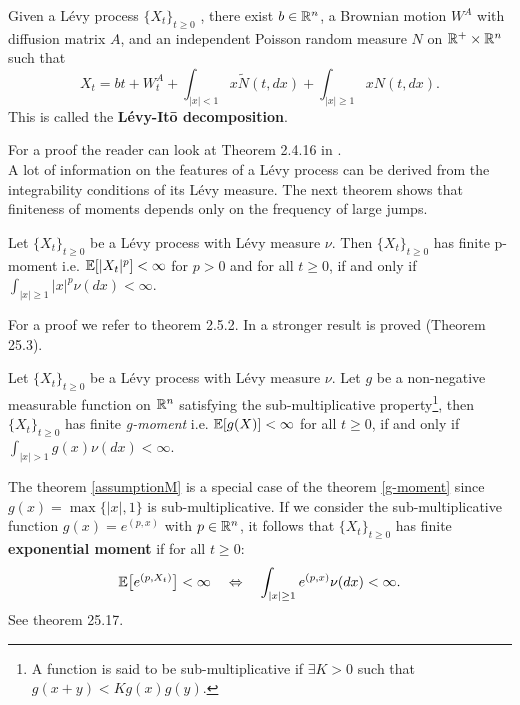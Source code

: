 \begin{Theorem}
 Given a Lévy process $\{X_t\}_{t \ge 0}$ , there exist $b\in \mathbb{R}^n$, a Brownian motion $W^A$ with diffusion matrix $A$, and an 
 independent Poisson random measure $N$ on $\mathbb{R}^+ \times \mathbb{R}^n$ such that
 \begin{equation}\label{Levy_Ito}
  X_t = bt + W^A_t + \int_{|x|<1} x \tilde{N}(t,dx) + \int_{|x|\geq1} x N(t,dx).
 \end{equation}
 This is called the \textbf{Lévy-It\={o} decomposition}.
\end{Theorem}
 For a proof the reader can look at Theorem 2.4.16 in \cite{Applebaum}.\\
A lot of information on the features of a Lévy process can be derived from the integrability conditions of its Lévy measure. 
The next theorem shows that finiteness of moments depends only on the frequency of large jumps.
\begin{Theorem} \label{assumptionM}
 Let $\{X_t\}_{t \geq 0}$ be a Lévy process with Lévy measure $\nu$. Then
  $\{X_t\}_{t \geq 0}$ has finite p-moment i.e. 
  $\mathbb{E}[|X_t|^p]<\infty$ for $p > 0$ and for all $t\geq0$, if and only if $\int_{|x| \geq 1} |x|^p \nu(dx) <\infty$.
\end{Theorem}
For a proof we refer to \cite{Applebaum} theorem 2.5.2.
In \cite{Sato} a stronger result is proved (Theorem 25.3).
\begin{Theorem}\label{g-moment}
 Let $\{X_t\}_{t \geq 0}$ be a Lévy process with Lévy measure $\nu$.
 Let $g$ be a non-negative measurable function on $\mathbb{R}^n$ satisfying the sub-multiplicative
 property\footnote{A function is said to be sub-multiplicative if $\exists K>0$ such that $g(x+y)<Kg(x)g(y)$.}, 
 then $\{X_t\}_{t \geq 0}$ has finite \emph{g-moment} i.e. $\mathbb{E}[g(X)]<\infty$ for all $t\geq0$, if and only if $\int_{|x| > 1} g(x) \nu(dx) <\infty$.
\end{Theorem}

The theorem \ref{assumptionM} is a special case of the theorem \ref{g-moment} since $g(x) = \max\{ |x|,1 \}$ is sub-multiplicative. 
If we consider the sub-multiplicative function $g(x) = e^{(p,x)}$ with $p\in \mathbb{R}^n$, 
it follows that
$\{X_t\}_{t \geq 0}$ has finite \textbf{exponential moment} if for all $t\geq0$:  
\begin{equation}\label{exp-moment}
\mathbb{E} \bigl[ e^{(p,X_t)} \bigr]<\infty \quad \Leftrightarrow \quad  
 \int_{|x| \geq 1} e^{(p,x)} \nu(dx) <\infty. 
\end{equation}
See \cite{Sato} theorem 25.17.

